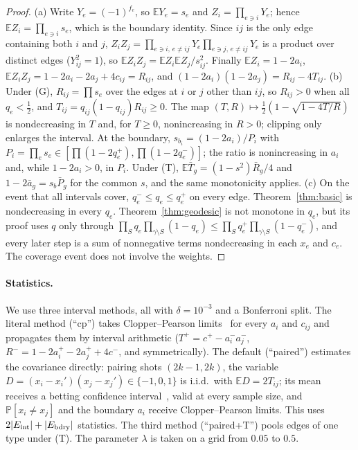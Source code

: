\documentclass[11pt]{article}
\theoremstyle{plain}
\theoremstyle{definition}
\theoremstyle{remark}
\newcommand{\Prob}{\mathbb{P}}
\newcommand{\E}{\mathbb{E}}
\renewcommand{\_}{\oldunderscore\allowbreak}
\begin{document}
\begin{proof}
(a) Write $Y_e=(-1)^{f_e}$, so $\E Y_e=s_e$ and $Z_i=\prod_{e\ni i}Y_e$; hence $\E Z_i=\prod_{e\ni i}s_e$, which is the boundary identity. Since $ij$ is the only edge containing both $i$ and $j$, $Z_iZ_j=\prod_{e\ni i,\,e\ne ij}Y_e\prod_{e\ni j,\,e\ne ij}Y_e$ is a product over distinct edges ($Y_{ij}^2=1$), so $\E Z_iZ_j=\E Z_i\E Z_j/s_{ij}^2$. Finally $\E Z_i=1-2a_i$, $\E Z_iZ_j=1-2a_i-2a_j+4c_{ij}=R_{ij}$, and $(1-2a_i)(1-2a_j)=R_{ij}-4T_{ij}$.
(b) Under (G), $R_{ij}=\prod s_e$ over the edges at $i$ or $j$ other than $ij$, so $R_{ij}>0$ when all $q_e<\tfrac12$, and $T_{ij}=q_{ij}(1-q_{ij})R_{ij}\ge0$. The map $(T,R)\mapsto\frac12(1-\sqrt{1-4T/R})$ is nondecreasing in $T$ and, for $T\ge0$, nonincreasing in $R>0$; clipping only enlarges the interval. At the boundary, $s_{b_i}=(1-2a_i)/P_i$ with $P_i=\prod_es_e\in[\prod(1-2q_e^+),\prod(1-2q_e^-)]$; the ratio is nonincreasing in $a_i$ and, while $1-2a_i>0$, in $P_i$. Under (T), $\E\bar T_g=(1-s^2)\bar R_g/4$ and $1-2\bar a_g=s_b\bar P_g$ for the common $s$, and the same monotonicity applies.
(c) On the event that all intervals cover, $q_e^-\le q_e\le q_e^+$ on every edge. Theorem~\ref{thm:basic} is nondecreasing in every $q_e$. Theorem~\ref{thm:geodesic} is not monotone in $q_e$, but its proof uses $q$ only through $\prod_Sq_e\prod_{\gamma\setminus S}(1-q_e)\le\prod_Sq_e^+\prod_{\gamma\setminus S}(1-q_e^-)$, and every later step is a sum of nonnegative terms nondecreasing in each $x_e$ and $c_e$. The coverage event does not involve the weights.
\end{proof}

\paragraph{Statistics.} We use three interval methods, all with $\delta=10^{-3}$ and a Bonferroni split. The literal method (``cp'') takes Clopper--Pearson limits~\cite{ClopperPearson} for every $a_i$ and $c_{ij}$ and propagates them by interval arithmetic ($T^+=c^+-a_i^-a_j^-$, $R^-=1-2a_i^+-2a_j^++4c^-$, and symmetrically). The default (``paired'') estimates the covariance directly: pairing shots $(2k-1,2k)$, the variable $D=(x_i-x_i')(x_j-x_j')\in\{-1,0,1\}$ is i.i.d.\ with $\E D=2T_{ij}$; its mean receives a betting confidence interval~\cite{WaudbySmithRamdas}, valid at every sample size, and $\Prob[x_i\ne x_j]$ and the boundary $a_i$ receive Clopper--Pearson limits. This uses $2|E_{\rm int}|+|E_{\rm bdry}|$ statistics. The third method (``paired+T'') pools edges of one type under (T). The parameter $\lambda$ is taken on a grid from $0.05$ to $0.5$.
\end{document}
